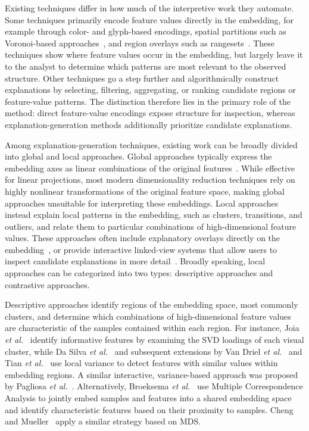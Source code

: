 \documentclass[lettersize,journal]{IEEEtran}
\newcommand{\etal}{\textit{et al.\xspace}}
\begin{document}
Existing techniques differ in how much of the interpretive work they automate.
Some techniques primarily encode feature values directly in the embedding, for example through color- and glyph-based encodings, spatial partitions such as Voronoi-based approaches~\cite{Broeksema2013}, and region overlays such as rangesets~\cite{Sohns2022}. These techniques show where feature values occur in the embedding, but largely leave it to the analyst to determine which patterns are most relevant to the observed structure.
Other techniques go a step further and algorithmically construct explanations by selecting, filtering, aggregating, or ranking candidate regions or feature-value patterns.
The distinction therefore lies in the primary role of the method: direct feature-value encodings expose structure for inspection, whereas explanation-generation methods additionally prioritize candidate explanations.

Among explanation-generation techniques, existing work can be broadly divided into global and local approaches.
Global approaches typically express the embedding axes as linear combinations of the original features~\cite{Broeksema2013,Coimbra2016}.
While effective for linear projections, most modern dimensionality reduction techniques rely on highly nonlinear transformations of the original feature space, making global approaches unsuitable for interpreting these embeddings.
Local approaches instead explain local patterns in the embedding, such as clusters, transitions, and outliers, and relate them to particular combinations of high-dimensional feature values.
These approaches often include explanatory overlays directly on the embedding~\cite{Joia2015,ChengMueller2016,Tian2021}, or provide interactive linked-view systems that allow users to inspect candidate explanations in more detail~\cite{Kandogan2012,Stahnke2016,Bibal2021}.
Broadly speaking, local approaches can be categorized into two types: descriptive approaches and contrastive approaches.

Descriptive approaches identify regions of the embedding space, most commonly clusters, and determine which combinations of high-dimensional feature values are characteristic of the samples contained within each region.
For instance, Joia \etal~\cite{Joia2015} identify informative features by examining the SVD loadings of each visual cluster, while Da Silva \etal~\cite{DaSilva2015} and subsequent extensions by Van Driel \etal~\cite{VanDriel2020} and Tian \etal~\cite{Tian2021} use local variance to detect features with similar values within embedding regions.
A similar interactive, variance-based approach was proposed by Pagliosa \etal~\cite{Pagliosa2016}.
Alternatively, Broeksema \etal~\cite{Broeksema2013} use Multiple Correspondence Analysis to jointly embed samples and features into a shared embedding space and identify characteristic features based on their proximity to samples. Cheng and Mueller~\cite{ChengMueller2016} apply a similar strategy based on MDS.
\end{document}
